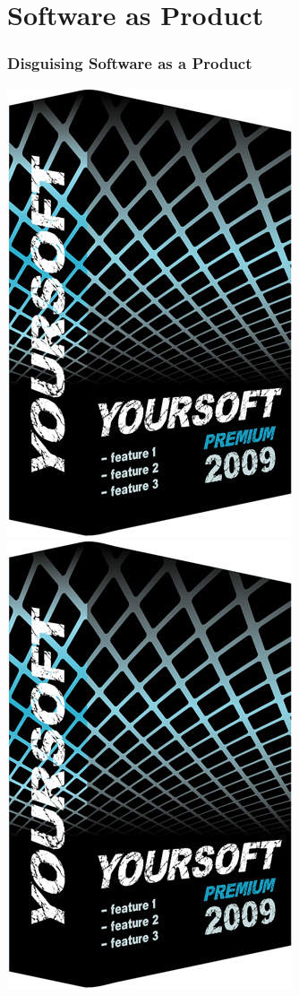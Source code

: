 \documentclass[18pt]{beamer}
\begin{document}
\section{Software as Product}


{
\begin{frame}
\frametitle{Disguising Software as a Product}
\begin{center}
  \includegraphics[width=0.4\paperwidth,height=0.8\paperheight]{../Art/4047547668_f46315f196_smaller.jpg}
  \includegraphics[width=0.4\paperwidth,height=0.8\paperheight]{../Art/4047547668_f46315f196_smaller.jpg}
\end{center}
\end{frame}
}
\end{document}
